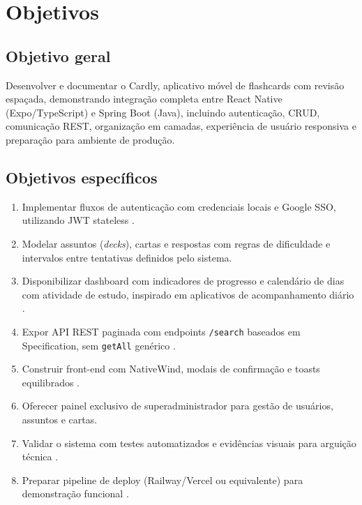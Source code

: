 \chapter{Objetivos}
\label{cap:objetivos}

\section{Objetivo geral}

Desenvolver e documentar o Cardly, aplicativo móvel de flashcards com revisão espaçada, demonstrando integração completa entre React Native (Expo/TypeScript) e Spring Boot (Java), incluindo autenticação, CRUD, comunicação REST, organização em camadas, experiência de usuário responsiva e preparação para ambiente de produção.

\section{Objetivos específicos}

\begin{enumerate}
    \item Implementar fluxos de autenticação com credenciais locais e Google SSO, utilizando JWT stateless \cite{jwt_io,google_oauth,spring_security_jwt}.
    \item Modelar assuntos (\textit{decks}), cartas e respostas com regras de dificuldade e intervalos entre tentativas definidos pelo sistema.
    \item Disponibilizar dashboard com indicadores de progresso e calendário de dias com atividade de estudo, inspirado em aplicativos de acompanhamento diário \cite{clue_app}.
    \item Expor API REST paginada com endpoints \texttt{/search} baseados em Specification, sem \texttt{getAll} genérico \cite{jpa_specification}.
    \item Construir front-end com NativeWind, modais de confirmação e toasts equilibrados \cite{nativewind_docs,toast_message_rn}.
    \item Oferecer painel exclusivo de superadministrador para gestão de usuários, assuntos e cartas.
    \item Validar o sistema com testes automatizados e evidências visuais para arguição técnica \cite{junit5_spring,jest_testing_library}.
    \item Preparar pipeline de deploy (Railway/Vercel ou equivalente) para demonstração funcional \cite{railway_docs,vercel_docs,expo_eas_build}.
\end{enumerate}


